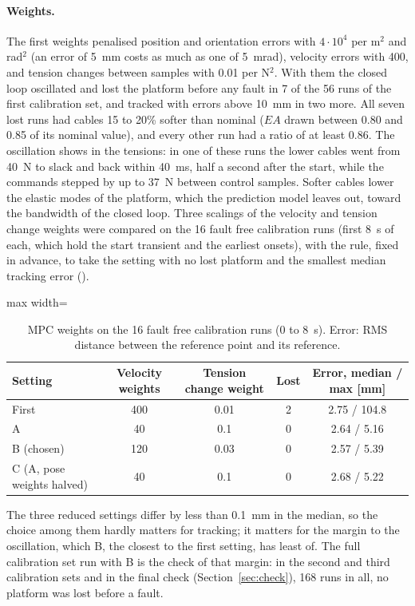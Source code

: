 \documentclass[10pt]{article}
\begin{document}
\paragraph{Weights.} The first weights penalised position and orientation errors with $4\cdot10^4$ per m$^2$ and rad$^2$ (an error of 5~mm costs as much as one of 5~mrad), velocity errors with 400, and tension changes between samples with 0.01 per N$^2$. With them the closed loop oscillated and lost the platform before any fault in 7 of the 56 runs of the first calibration set, and tracked with errors above 10~mm in two more. All seven lost runs had cables 15 to 20\% softer than nominal ($EA$ drawn between 0.80 and 0.85 of its nominal value), and every other run had a ratio of at least 0.86. The oscillation shows in the tensions: in one of these runs the lower cables went from 40~N to slack and back within 40~ms, half a second after the start, while the commands stepped by up to 37~N between control samples. Softer cables lower the elastic modes of the platform, which the prediction model leaves out, toward the bandwidth of the closed loop. Three scalings of the velocity and tension change weights were compared on the 16 fault free calibration runs (first 8~s of each, which hold the start transient and the earliest onsets), with the rule, fixed in advance, to take the setting with no lost platform and the smallest median tracking error ().

\begin{table}[h]
\centering\small
\caption{MPC weights on the 16 fault free calibration runs (0 to 8~s). Error: RMS distance between the reference point and its reference.}\label{tab:weights}
\begin{adjustbox}{max width=\linewidth}\begin{tabular}{@{}lcccc@{}}
\toprule
Setting & Velocity weights & Tension change weight & Lost & Error, median / max [mm] \\
\midrule
First & 400 & 0.01 & 2 & 2.75 / 104.8 \\
A & 40 & 0.1 & 0 & 2.64 / 5.16 \\
B (chosen) & 120 & 0.03 & 0 & 2.57 / 5.39 \\
C (A, pose weights halved) & 40 & 0.1 & 0 & 2.68 / 5.22 \\
\bottomrule
\end{tabular}\end{adjustbox}
\end{table}

The three reduced settings differ by less than 0.1~mm in the median, so the choice among them hardly matters for tracking; it matters for the margin to the oscillation, which B, the closest to the first setting, has least of. The full calibration set run with B is the check of that margin: in the second and third calibration sets and in the final check (Section~\ref{sec:check}), 168 runs in all, no platform was lost before a fault.
\end{document}
